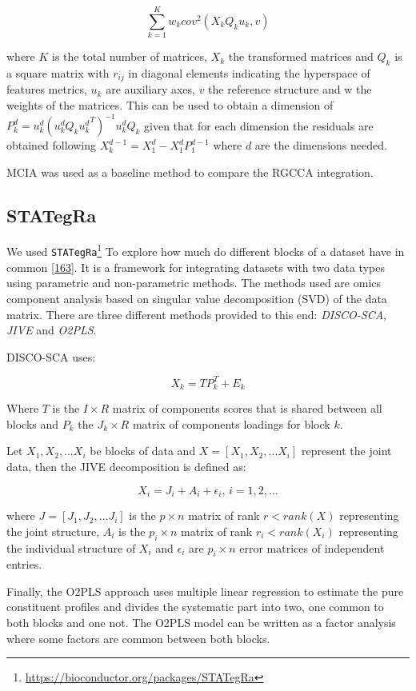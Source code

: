 \documentclass[
  a4paper,
]{book}
\DeclareRobustCommand{\href}[2]{#2\footnote{\url{#1}}}
\begin{document}
\[
\sum_{k=1}^K w_k {cov}^2 (X_k Q_k u_k, v)
\]

where \(K\) is the total number of matrices, \(X_k\) the transformed matrices and \(Q_k\) is a square matrix with \(r_{ij}\) in diagonal elements indicating the hyperspace of features metrics, \(u_k\) are auxiliary axes, \(v\) the reference structure and w the weights of the matrices.
This can be used to obtain a dimension of \(P_k^d=u_k^d(u_k^d Q_k {u_k^d}^T)^{-1} u_k^d Q_k\) given that for each dimension the residuals are obtained following \(X_k^{d-1} = X_1^d- X_1^d P_1^{d-1}\) where \(d\) are the dimensions needed.

MCIA was used as a baseline method to compare the RGCCA integration.

\hypertarget{stategra}{%
\subsection{STATegRa}\label{stategra}}

We used \href{https://bioconductor.org/packages/STATegRa}{\texttt{STATegRa}} To explore how much do different blocks of a dataset have in common {[}\protect\hyperlink{ref-planell2021}{163}{]}.
It is a framework for integrating datasets with two data types using parametric and non-parametric methods.
The methods used are omics component analysis based on singular value decomposition (SVD) of the data matrix.
There are three different methods provided to this end: \emph{DISCO-SCA}, \emph{JIVE} and \emph{O2PLS}.

DISCO-SCA uses:

\[
X_k = TP_k ^ T + E_k
\]

Where \(T\) is the \(I \times R\) matrix of components scores that is shared between all blocks and \(P_k\) the \(J_k \times R\) matrix of components loadings for block \(k\).

Let \(X_1,X_2, \dots X_i\) be blocks of data and \(X=[X_1,X_2, \dots X_i]\) represent the joint data, then the JIVE decomposition is defined as:

\[X_i=J_i+A_i+\epsilon_i \text{, }i = 1,2, \dots\]

where \(J=[J_1,J_2, \dots J_i]\) is the \(p \times n\) matrix of rank \(r<rank(X)\) representing the joint structure, \(A_i\) is the \(p_i\times n\) matrix of rank \(r_i < rank(X_i)\) representing the individual structure of \(X_i\) and \(\epsilon_i\) are \(p_i \times n\) error matrices of independent entries.

Finally, the O2PLS approach uses multiple linear regression to estimate the pure constituent profiles and divides the systematic part into two, one common to both blocks and one not.
The O2PLS model can be written as a factor analysis where some factors are common between both blocks.
\end{document}
